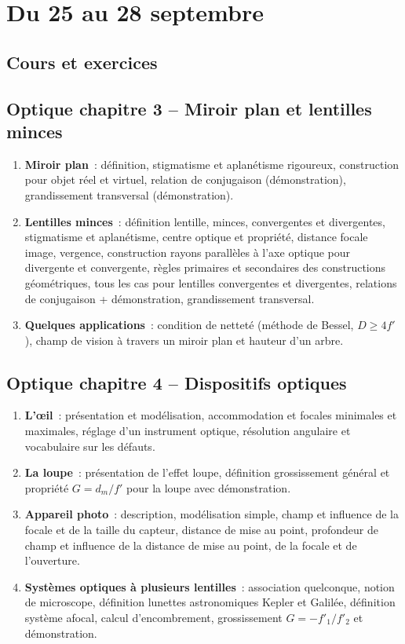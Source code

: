 \documentclass[a4paper, 12pt, final, garamond]{book}
\begin{document}
\setcounter{chapter}{1}

\chapter{Du 25 au 28 septembre}

\section{Cours et exercices}

\section*{Optique chapitre 3 -- Miroir plan et lentilles minces}
\begin{enumerate}[label=\Roman*]
	\item \textbf{Miroir plan}~: définition, stigmatisme et aplanétisme
	      rigoureux, construction pour objet réel et virtuel, relation de
	      conjugaison (démonstration), grandissement transversal (démonstration).
	\item \textbf{Lentilles minces}~: définition lentille, minces, convergentes
	      et divergentes, stigmatisme et aplanétisme, centre optique et propriété,
	      distance focale image, vergence, construction rayons parallèles à l'axe
	      optique pour divergente et convergente, règles primaires et secondaires
	      des constructions géométriques, tous les cas pour lentilles convergentes
	      et divergentes, relations de conjugaison + démonstration, grandissement
	      transversal.
	\item \textbf{Quelques applications}~: condition de netteté (méthode de
	      Bessel, $D \geq 4f'$), champ de vision à travers un miroir plan et
	      hauteur d'un arbre.
\end{enumerate}

\section*{Optique chapitre 4 -- Dispositifs optiques}
\begin{enumerate}[label=\Roman*]
	\item \textbf{L'œil}~: présentation et modélisation, accommodation et
	      focales minimales et maximales, réglage d'un instrument optique,
	      résolution angulaire et vocabulaire sur les défauts.
	\item \textbf{La loupe}~: présentation de l'effet loupe, définition
	      grossissement général et propriété $G = d_m/f'$ pour la loupe avec
	      démonstration.
	\item \textbf{Appareil photo}~: description, modélisation simple, champ et
	      influence de la focale et de la taille du capteur, distance de mise au
	      point, profondeur de champ et influence de la distance de mise au point,
	      de la focale et de l'ouverture.
	\item \textbf{Systèmes optiques à plusieurs lentilles}~: association
	      quelconque, notion de microscope, définition lunettes astronomiques
	      Kepler et Galilée, définition système afocal, calcul d'encombrement,
	      grossissement $G=-f'_1/f'_2$ et démonstration.
\end{enumerate}
\end{document}
